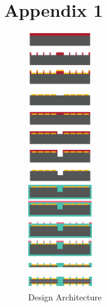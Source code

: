 \documentclass[12pt]{article}
\numberwithin{equation}{section}
\numberwithin{table}{section}
\numberwithin{figure}{section}
\begin{document}
 
\appendix

\section{Appendix 1} 
\label{appendix_1}

\begin{figure} \centering
  \includegraphics[width=0.25\textwidth]{DesignArchitecture.png}
  \caption{Design Architecture}
  \label{DesignArchitecture}
\end{figure}




\end{document}
